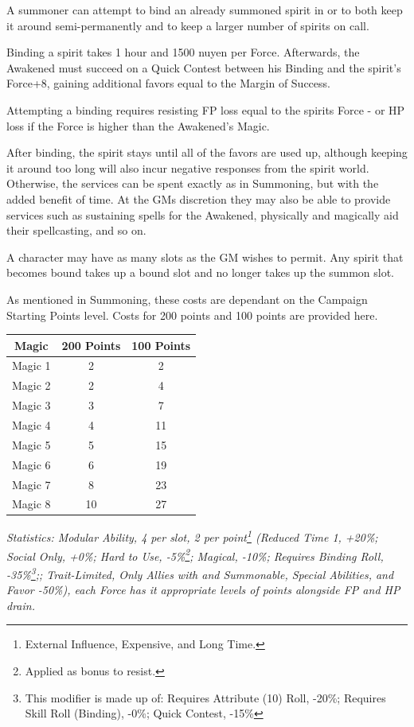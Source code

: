 \begin{multicols*}{3}
	A summoner can attempt to bind an already summoned spirit in or to both keep it around semi-permanently and to keep a larger number of spirits on call.
	
	Binding a spirit takes 1 hour and 1500 nuyen per Force. Afterwards, the Awakened must succeed on a Quick Contest between his Binding and the spirit's Force+8, gaining additional favors equal to the Margin of Success.
	
	Attempting a binding requires resisting FP loss equal to the spirits Force - or HP loss if the Force is higher than the Awakened's Magic. 
	
	After binding, the spirit stays until all of the favors are used up, although keeping it around too long will also incur negative responses from the spirit world. Otherwise, the services can be spent exactly as in Summoning, but with the added benefit of time. At the GMs discretion they may also be able to provide services such as sustaining spells for the Awakened, physically and magically aid their spellcasting, and so on.
	
	A character may have as many slots as the GM wishes to permit. Any spirit that becomes bound takes up a bound slot and no longer takes up the summon slot.
	
	As mentioned in Summoning, these costs are dependant on the Campaign Starting Points level. Costs for 200 points and 100 points are provided here.
	
	\begin{center}
		\begin{tabular}{|c|c|c|}
			\hline
			Magic & 200 Points & 100 Points \\
			\hline
			\hline
			Magic 1 & 2 & 2 \\
			Magic 2 & 2 & 4 \\
			Magic 3 & 3 & 7 \\
			Magic 4 & 4 & 11 \\
			Magic 5 & 5 & 15 \\
			Magic 6 & 6 & 19 \\
			Magic 7 & 8 & 23 \\
			Magic 8 & 10 & 27 \\
			\hline
		\end{tabular}
	\end{center}
	
	\textit{\textcolor{OliveGreen}{Statistics: Modular Ability, 4 per slot, 2 per point\footnote{External Influence, Expensive, and Long Time.} (Reduced Time 1, +20\%; Social Only, +0\%; Hard to Use, -5\%\footnote{Applied as bonus to resist.}; Magical, -10\%; Requires Binding Roll, -35\%\footnote{This modifier is made up of: Requires Attribute (10) Roll, -20\%; Requires Skill Roll (Binding), -0\%; Quick Contest, -15\%};; Trait-Limited, Only Allies with and Summonable, Special Abilities, and Favor -50\%), each Force has it appropriate levels of points alongside FP and HP drain.}}
	

\end{multicols*}
